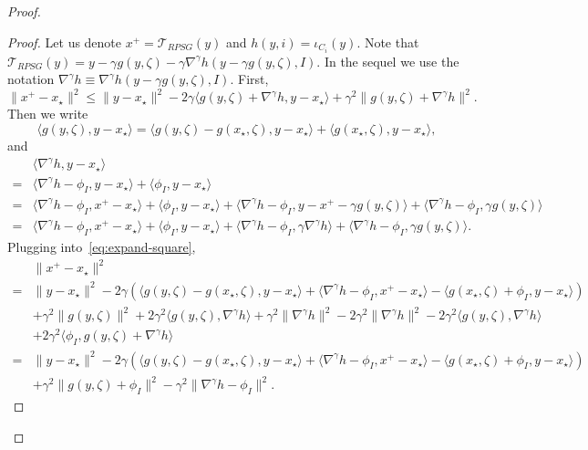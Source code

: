 \documentclass{article}
\newcommand{\1}{\mathbbm 1}
\newcommand{\cT}{{{\mathcal T}}}
\newcommand{\ps}[1]{\langle #1 \rangle}
\theoremstyle{definition}
\begin{document}
\begin{proof}
\begin{proof}
Let us denote $x^+ = \cT_{RPSG}(y)$ and $h(y,i) = \iota_{C_i}(y)$. Note that $\cT_{RPSG}(y) = y - \gamma g(y,\zeta) - \gamma \nabla ^\gamma h(y - \gamma g(y,\zeta),I)$. In the sequel we use the notation $\nabla ^\gamma h \equiv \nabla ^\gamma h(y - \gamma g(y,\zeta),I)$. First,
\begin{equation}
\label{eq:expand-square}
    \|x^+ - x_\star\|^2 \leq \|y - x_\star\|^2 -2\gamma\ps{g(y,\zeta) + \nabla ^\gamma h, y - x_\star} + \gamma^2\|g(y,\zeta) + \nabla ^\gamma h\|^2.
\end{equation}
Then we write
\begin{equation*}
    \ps{g(y,\zeta),y-x_\star} = \ps{g(y,\zeta) - g(x_\star,\zeta),y-x_\star} + \ps{g(x_\star,\zeta),y-x_\star},
\end{equation*}
and
\begin{align*}
    &\ps{\nabla ^\gamma h,y-x_\star} \\=& \ps{\nabla ^\gamma h - \phi_I,y-x_\star} + \ps{\phi_I,y-x_\star}\\
    =&\ps{\nabla ^\gamma h - \phi_I,x^+-x_\star} + \ps{\phi_I,y-x_\star} + \ps{\nabla ^\gamma h - \phi_I,y - x^+- \gamma g(y,\zeta)} + \ps{\nabla ^\gamma h - \phi_I, \gamma g(y,\zeta)}\\
    =&\ps{\nabla ^\gamma h - \phi_I,x^+-x_\star} + \ps{\phi_I,y-x_\star} + \ps{\nabla ^\gamma h - \phi_I,\gamma \nabla ^\gamma h} + \ps{\nabla ^\gamma h - \phi_I, \gamma g(y,\zeta)}.
\end{align*}
Plugging into~\eqref{eq:expand-square},
\begin{align*}
\label{eq:expand-square}
    &\|x^+ - x_\star\|^2 \\ 
    =& \|y - x_\star\|^2 -2\gamma \left(\ps{g(y,\zeta) - g(x_\star,\zeta),y-x_\star} + \ps{\nabla ^\gamma h - \phi_I,x^+-x_\star} - \ps{g(x_\star,\zeta)+ \phi_I,y-x_\star}\right)\\
    &+ \gamma^2\|g(y,\zeta)\|^2 + 2\gamma^2\ps{g(y,\zeta),\nabla ^\gamma h} + \gamma^2\|\nabla ^\gamma h\|^2 - 2\gamma^2\|\nabla ^\gamma h\|^2 - 2\gamma^2\ps{g(y,\zeta),\nabla ^\gamma h}\\
    &+ 2\gamma^2\ps{\phi_I,g(y,\zeta)+\nabla ^\gamma h}\\
    =& \|y - x_\star\|^2 -2\gamma \left(\ps{g(y,\zeta) - g(x_\star,\zeta),y-x_\star} + \ps{\nabla ^\gamma h - \phi_I,x^+-x_\star} - \ps{g(x_\star,\zeta)+ \phi_I,y-x_\star}\right)\\
    &+ \gamma^2\|g(y,\zeta) + \phi_I\|^2 - \gamma^2\|\nabla ^\gamma h - \phi_I\|^2.
\end{align*}

\end{proof}
\end{proof}
\end{document}
